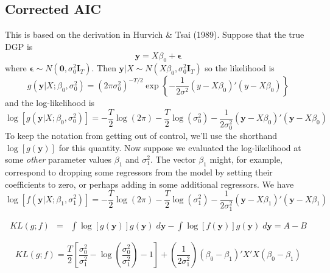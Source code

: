 \documentclass[12pt]{article}
\theoremstyle{definition}
\begin{document}
\subsection{Corrected AIC}
This is based on the derivation in Hurvich \& Tsai (1989). Suppose that the true DGP is
	$$\textbf{y} = X\beta_0 + \boldsymbol{\epsilon}$$
where $\mathbf{\epsilon} \sim N(\mathbf{0}, \sigma_0^2 \mathbf{I}_T)$. Then $\mathbf{y}|X \sim N(X\beta_0, \sigma_0^2 \mathbf{I}_T)$ so the likelihood is
	$$g(\textbf{y}|X;\beta_0, \sigma^2_0) = \left(2\pi\sigma_0^2\right)^{-T/2} \exp\left\{ -\frac{1}{2\sigma^2}(y - X\beta_0)'(y - X\beta_0)\right\}$$
and the log-likelihood is
	$$\log\left[g(\textbf{y}|X;\beta_0, \sigma_0^2)\right] = -\frac{T}{2}\log(2\pi) -\frac{T}{2} \log(\sigma^2_0) - \frac{1}{2\sigma_0^2}\left(\textbf{y} - X\beta_0\right)'\left(\textbf{y} -X\beta_0\right)$$
To keep the notation from getting out of control, we'll use the shorthand $\log[g(\mathbf{y})]$ for this quantity. Now suppose we evaluated the log-likelihood at some \emph{other} parameter values $\beta_1$ and $\sigma^2_1$. The vector $\beta_1$ might, for example, correspond to dropping some regressors from the model by setting their coefficients to zero, or perhaps adding in some additional regressors. We have
	$$\log[f(\textbf{y}|X;\beta_1, \sigma_1^2)] =  -\frac{T}{2}\log(2\pi) -\frac{T}{2} \log(\sigma^2_1) - \frac{1}{2\sigma_1^2}\left(\textbf{y} - X\beta_1\right)'\left(\textbf{y} -X\beta_1\right)$$

\begin{eqnarray*}
	KL(g;f)&=& \int \log[g(\mathbf{y})] g(\mathbf{y}) \; d \mathbf{y} - \int \log[f(\mathbf{y})]g(\mathbf{y}) \; d \mathbf{y} =  A - B 
\end{eqnarray*}

	$$KL(g;f) =  \frac{T}{2}\left[\frac{\sigma_0^2}{\sigma_1^2} - \log\left(\frac{\sigma_0^2}{\sigma_1^2}\right) - 1 \right] + \left(\frac{1}{2 \sigma_1^2}\right)\left(\beta_0 - \beta_1\right)'X'X\left(\beta_0 - \beta_1\right)$$
\end{document}
